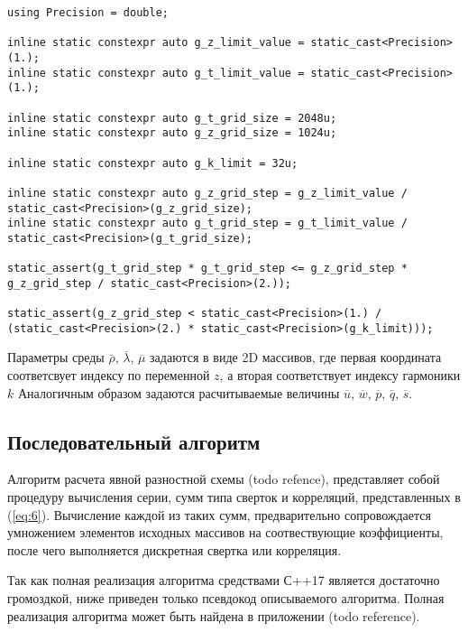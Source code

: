 \begin{lstlisting}[style={CppCodeStyle}]
using Precision = double;

inline static constexpr auto g_z_limit_value = static_cast<Precision>(1.);
inline static constexpr auto g_t_limit_value = static_cast<Precision>(1.);

inline static constexpr auto g_t_grid_size = 2048u;
inline static constexpr auto g_z_grid_size = 1024u;

inline static constexpr auto g_k_limit = 32u;

inline static constexpr auto g_z_grid_step = g_z_limit_value / static_cast<Precision>(g_z_grid_size);
inline static constexpr auto g_t_grid_step = g_t_limit_value / static_cast<Precision>(g_t_grid_size);

static_assert(g_t_grid_step * g_t_grid_step <= g_z_grid_step * g_z_grid_step / static_cast<Precision>(2.));

static_assert(g_z_grid_step < static_cast<Precision>(1.) / (static_cast<Precision>(2.) * static_cast<Precision>(g_k_limit)));
\end{lstlisting}

Параметры среды $\overline\rho$, $\overline\lambda$, $\overline\mu$ задаются в виде 2D массивов, 
где первая координата соответсвует индексу по переменной $z$, а вторая соответствует индексу гармоники $k$
Аналогичным образом задаются расчитываемые величины $\overline u$, $\overline w$, $\overline p$, $\overline q$, $\overline s$.

\subsection{Последовательный алгоритм}

Алгоритм расчета явной разностной схемы (todo refence), представляет собой процедуру вычисления серии, сумм типа сверток и корреляций,
представленных в (\ref{eq:6}). Вычисление каждой из таких сумм, предварительно сопровождается умножением элементов исходных 
массивов на соотвествующие коэффициенты, после чего выполняется дискретная свертка или корреляция.

Так как полная реализация алгоритма средствами С++17 является достаточно громоздкой, ниже приведен только псевдокод описываемого алгоритма.
Полная реализация алгоритма может быть найдена в приложении (todo reference).

